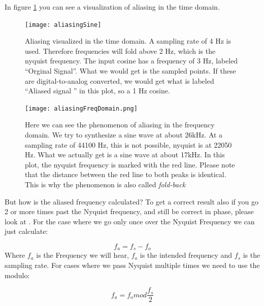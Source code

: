 In figure \ref{fig:cosAlias} you can see a visualization of aliasing in the time domain.

\begin{figure}[H]
	\centering
	\texttt{[image: aliasingSine]}
	\caption[Aliasing]
	{Aliasing visualized in the time domain. A sampling rate of 4 Hz is used. Therefore frequencies will fold above 2 Hz, which is the nyquist frequency. The input cosine has a frequency of 3 Hz, labeled ``Orginal Signal''. What we would get is the sampled points. If these are digital-to-analog converted, we would get what is labeled ``Aliased signal '' in this plot, so a 1 Hz cosine.}
	\label{fig:cosAlias}
\end{figure}



\begin{figure}[H]
	\begin{center}
		\texttt{[image: aliasingFreqDomain.png]}
		\caption[Aliasing in the Frequency Domain]
		{Here we can see the phenomenon of aliasing in the frequency domain. We try to synthesize a sine wave at about 26kHz. At a sampling rate of 44100 Hz, this is not possible, nyquist is at 22050 Hz. What we actually get is a sine wave at about 17kHz. In this plot, the nyquist frequency is marked with the red line. Please note that the distance between the red line to both peaks is identical. This is why the phenomenon is also called \textit{fold-back}}
		\label{fig:name}
	\end{center}
\end{figure}


But how is the aliased frequency calculated? To get a correct result also if you go 2 or more times past the Nyquist frequency, and still be correct in phase, please look at . For the case where we go only once over the Nyquist Frequency we can just calculate:

\begin{equation}
	f_a = f_s-f_o
\end{equation}
Where $f_a$ is the Frequency we will hear, $f_o$ is the intended frequency and $f_s$ is the sampling rate. For cases where we pass Nyquist multiple times we need to use the modulo:

\begin{equation}
	f_a = f_o mod  \frac{f_s}{2}
\end{equation}


